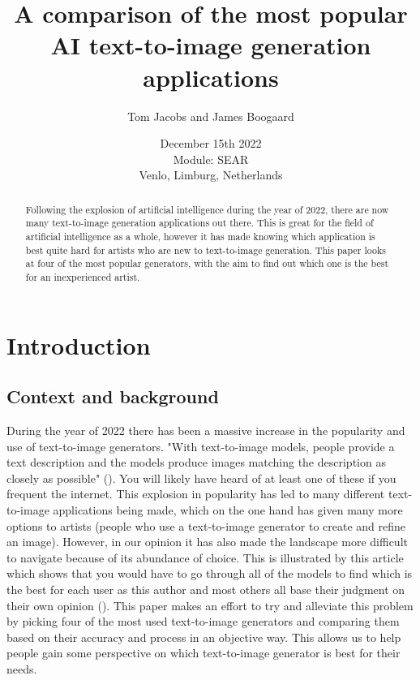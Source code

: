 \documentclass[]{report}
\title{A comparison of the most popular AI text-to-image generation applications}
\author{Tom Jacobs and James Boogaard}
\date{December 15th 2022 \\Module: SEAR \\Venlo, Limburg, Netherlands}
\begin{document}
	
	\maketitle
	
	\begin{abstract}
		Following the explosion of artificial intelligence during the year of 2022, there are now many text-to-image generation applications out there. This is great for the field of artificial intelligence as a whole, however it has made knowing which application is best quite hard for artists who are new to text-to-image generation. This paper looks at four of the most popular generators, with the aim to find out which one is the best for an inexperienced artist.
		
		
	\end{abstract}
	
	\tableofcontents
	\setcounter{page}{3}
	\listoffigures %
	\pagebreak
	
	
	\section{Introduction}
	
	\subsection{Context and background}
	During the year of 2022 there has been a massive increase in the popularity and use of text-to-image generators. "With text-to-image models, people provide a text description and the models produce images matching the description as closely as possible" (\cite{whatIsTextToImageGen}). You will likely have heard of at least one of these if you frequent the internet. This explosion in popularity has led to many different text-to-image applications being made, which on the one hand has given many more options to artists (people who use a text-to-image generator to create and refine an image). However, in our opinion it has also made the landscape more difficult to navigate because of its abundance of choice. This is illustrated by this article which shows that you would have to go through all of the models to find which is the best for each user as this author and most others all base their judgment on their own opinion (\cite{whyUseImageComp}). This paper makes an effort to try and alleviate this problem by picking four of the most used text-to-image generators and comparing them based on their accuracy and process in an objective way. This allows us to help people gain some perspective on which text-to-image generator is best for their needs.
	
\end{document}
